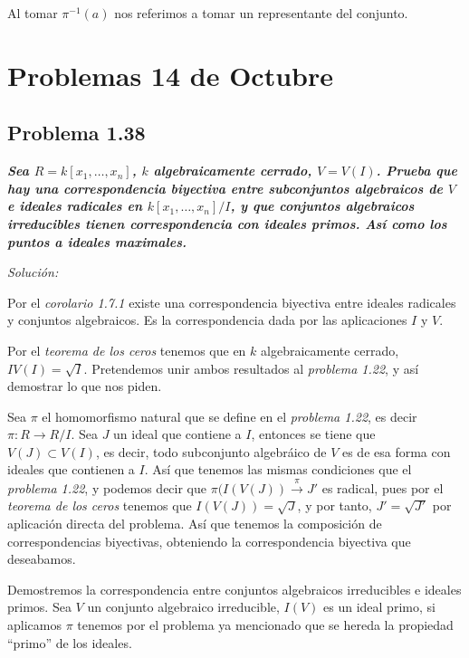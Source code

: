 \begin{nota}
Al tomar $\pi^{-1}(a)$ nos referimos a tomar un representante del conjunto.
\end{nota}


\section{Problemas 14 de Octubre}

\subsection{Problema 1.38}

\textbf{\textit{Sea $R=k[x_1,\dots,x_n]$, $k$ algebraicamente cerrado, $V=V(I)$. Prueba que hay una correspondencia biyectiva entre subconjuntos algebraicos de $V$ e ideales radicales en $k[x_1,\dots,x_n]/I$, y que conjuntos algebraicos irreducibles tienen correspondencia con ideales primos. Así como los puntos a ideales maximales.}}

\textit{Solución: }

Por el \textit{corolario 1.7.1} existe una correspondencia biyectiva entre ideales radicales y conjuntos algebraicos. Es la correspondencia dada por las aplicaciones $I$ y $V$.

Por el \textit{teorema de los ceros} tenemos que en $k$ algebraicamente cerrado, $IV(I)=\sqrt{I}$.
Pretendemos unir ambos resultados al \textit{problema 1.22}, y así demostrar lo que nos piden.

Sea $\pi $ el homomorfismo natural que se define en el \textit{problema 1.22}, es decir $\pi : R \rightarrow R/I$. Sea $J$ un ideal que contiene a $I$, entonces se tiene que $V(J)\subset V(I)$, es decir, todo subconjunto algebráico de $V$ es de esa forma con ideales que contienen a $I$. Así que tenemos las mismas condiciones que el \textit{problema 1.22}, y podemos decir que $\pi(I(V(J)) \xrightarrow{\pi} J'$ es radical, pues por el \textit{teorema de los ceros} tenemos que $I(V(J))=\sqrt{J}$, y por tanto, $J'=\sqrt{J'}$ por aplicación directa del problema. Así que tenemos la composición de correspondencias biyectivas, obteniendo la correspondencia biyectiva que deseabamos.

Demostremos la correspondencia entre conjuntos algebraicos irreducibles e ideales primos. Sea $V$ un conjunto algebraico irreducible, $I(V)$ es un ideal primo, si aplicamos $\pi$ tenemos por el problema ya mencionado que se hereda la propiedad ``primo'' de los ideales.


